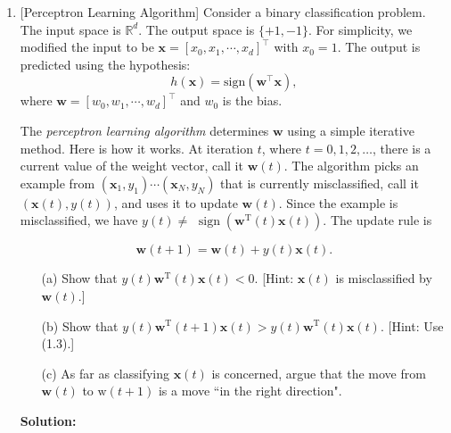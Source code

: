 \documentclass[10pt]{article}
\begin{document}
\begin{enumerate}[1.]
	\item {} [Perceptron Learning Algorithm]
            Consider a binary classification problem. The input space is $\mathbb{R}^{d}$. The output space is $\{ +1, -1 \}$. For simplicity, we modified the input to be $\mathbf{x} = [x_0, x_1, \cdots, x_d]^{\intercal}$ with $x_0=1$. The output is predicted using the hypothesis:
            \begin{equation}
                h(\mathbf{x}) = \text{sign}(\mathbf{w}^{\intercal}\mathbf{x}),
            \end{equation}
            where $\mathbf{w} = [w_0, w_1, \cdots, w_d]^{\intercal}$ and $w_0$ is the bias.
            
            The \textit{perceptron learning algorithm} determines $\mathbf{w}$ using a simple iterative method. Here is how it works. At iteration $t$, where $t=0,1,2, \ldots$, there is a current value of the weight vector, call it $\mathbf{w}(t)$. The algorithm picks an example from $\left(\mathbf{x}_1, y_1\right) \cdots\left(\mathbf{x}_N, y_N\right)$ that is currently misclassified, call it $(\mathbf{x}(t), y(t))$, and uses it to update $\mathbf{w}(t)$. Since the example is misclassified, we have $y(t) \neq$ $\operatorname{sign}\left(\mathbf{w}^{\mathrm{T}}(t) \mathbf{x}(t)\right)$. The update rule is

            \begin{equation}
                \mathbf{w}(t+1)=\mathbf{w}(t)+y(t) \mathbf{x}(t).    
            \end{equation}

                
		\begin{itemize}
			\item[(a)] Show that $y(t) \mathbf{w}^{\mathrm{T}}(t) \mathbf{x}(t)<0$. [Hint: $\mathbf{x}(t)$ is misclassified by $\mathbf{w}(t)$.]~ 
			\item[(b)] Show that $y(t) \mathbf{w}^{\mathrm{T}}(t+1) \mathbf{x}(t)>y(t) \mathbf{w}^{\mathrm{T}}(t) \mathbf{x}(t)$. [Hint: Use (1.3).]~ 
			\item[(c)]   As far as classifying $\mathbf{x}(t)$ is concerned, argue that the move from $\mathbf{w}(t)$ to $\mathrm{w}(t+1)$ is a move ``in the right direction".~ 
		\end{itemize}

		\textbf{Solution:}

\end{enumerate}
\end{document}
